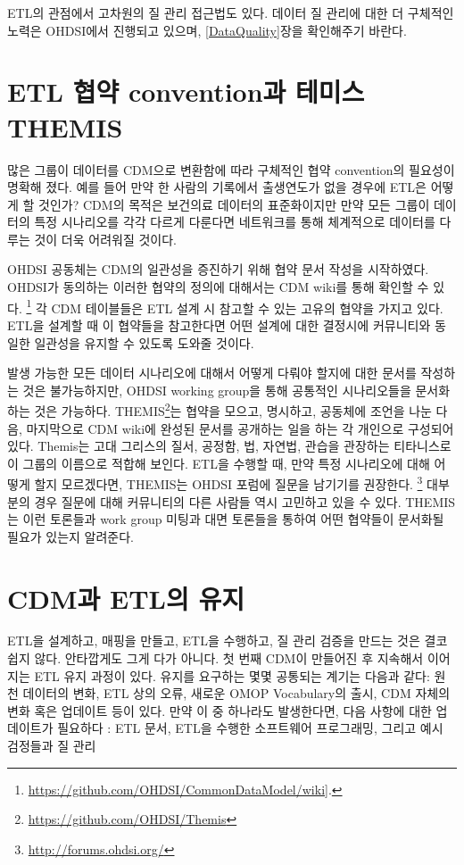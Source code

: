 \documentclass[11pt]{book}
\let\rmarkdownfootnote\footnote%
\def\footnote{\protect\rmarkdownfootnote}
\theoremstyle{definition}
\theoremstyle{definition}
\theoremstyle{definition}
\theoremstyle{remark}
\begin{document}
ETL의 관점에서 고차원의 질 관리 접근법도 있다. 데이터 질 관리에 대한 더
구체적인 노력은 OHDSI에서 진행되고 있으며, \ref{DataQuality}장을
확인해주기 바란다.

\section{ETL 협약 convention과 테미스
THEMIS}\label{etl--convention--themis}

많은 그룹이 데이터를 CDM으로 변환함에 따라 구체적인 협약 convention의
필요성이 명확해 졌다. 예를 들어 만약 한 사람의 기록에서 출생연도가 없을
경우에 ETL은 어떻게 할 것인가? CDM의 목적은 보건의료 데이터의
표준화이지만 만약 모든 그룹이 데이터의 특정 시나리오를 각각 다르게
다룬다면 네트워크를 통해 체계적으로 데이터를 다루는 것이 더욱 어려워질
것이다.

OHDSI 공동체는 CDM의 일관성을 증진하기 위해 협약 문서 작성을 시작하였다.
OHDSI가 동의하는 이러한 협약의 정의에 대해서는 CDM wiki를 통해 확인할 수
있다. \footnote{\url{https://github.com/OHDSI/CommonDataModel/wiki}{]}.}
각 CDM 테이블들은 ETL 설계 시 참고할 수 있는 고유의 협약을 가지고 있다.
ETL을 설계할 때 이 협약들을 참고한다면 어떤 설계에 대한 결정시에
커뮤니티와 동일한 일관성을 유지할 수 있도록 도와줄 것이다.

발생 가능한 모든 데이터 시나리오에 대해서 어떻게 다뤄야 할지에 대한
문서를 작성하는 것은 불가능하지만, OHDSI working group을 통해 공통적인
시나리오들을 문서화하는 것은 가능하다. THEMIS\footnote{\url{https://github.com/OHDSI/Themis}}는
협약을 모으고, 명시하고, 공동체에 조언을 나눈 다음, 마지막으로 CDM
wiki에 완성된 문서를 공개하는 일을 하는 각 개인으로 구성되어 있다.
Themis는 고대 그리스의 질서, 공정함, 법, 자연법, 관습을 관장하는
티타니스로 이 그룹의 이름으로 적합해 보인다. ETL을 수행할 때, 만약 특정
시나리오에 대해 어떻게 할지 모르겠다면, THEMIS는 OHDSI 포럼에 질문을
남기기를 권장한다. \footnote{\url{http://forums.ohdsi.org/}} 대부분의
경우 질문에 대해 커뮤니티의 다른 사람들 역시 고민하고 있을 수 있다.
THEMIS는 이런 토론들과 work group 미팅과 대면 토론들을 통하여 어떤
협약들이 문서화될 필요가 있는지 알려준다.

\section{CDM과 ETL의 유지}\label{CDMandETLMaintenance}

ETL을 설계하고, 매핑을 만들고, ETL을 수행하고, 질 관리 검증을 만드는
것은 결코 쉽지 않다. 안타깝게도 그게 다가 아니다. 첫 번째 CDM이 만들어진
후 지속해서 이어지는 ETL 유지 과정이 있다. 유지를 요구하는 몇몇 공통되는
계기는 다음과 같다: 원천 데이터의 변화, ETL 상의 오류, 새로운 OMOP
Vocabulary의 출시, CDM 자체의 변화 혹은 업데이트 등이 있다. 만약 이 중
하나라도 발생한다면, 다음 사항에 대한 업데이트가 필요하다 : ETL 문서,
ETL을 수행한 소프트웨어 프로그래밍, 그리고 예시 검정들과 질 관리
\end{document}
